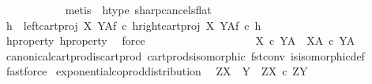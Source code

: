 \begin{isabellebody}
\ \ \ \ \ \ \ \ \ \ \isamarkupfalse%
\ {\isacharparenleft}{\kern0pt}metis\ \ h{\isacharunderscore}{\kern0pt}type\ sharp{\isacharunderscore}{\kern0pt}cancels{\isacharunderscore}{\kern0pt}flat{\isacharparenright}{\kern0pt}\isanewline
\ \ \ \ \ \ \ \ \isamarkupfalse%
\ \isamarkupfalse%
\ {\isachardoublequoteopen}h\ {\isacharequal}{\kern0pt}\ {\isasymlangle}{\isacharparenleft}{\kern0pt}left{\isacharunderscore}{\kern0pt}cart{\isacharunderscore}{\kern0pt}proj\ X\ Y\isactrlbsup A\isactrlesup \isactrlsub f\ {\isasymcirc}\isactrlsub c\ h{\isacharparenright}{\kern0pt}\isactrlsup {\isasymflat}{\isacharcomma}{\kern0pt}{\isacharparenleft}{\kern0pt}right{\isacharunderscore}{\kern0pt}cart{\isacharunderscore}{\kern0pt}proj\ X\ Y\isactrlbsup A\isactrlesup \isactrlsub f\ {\isasymcirc}\isactrlsub c\ h{\isacharparenright}{\kern0pt}\isactrlsup {\isasymflat}{\isasymrangle}\isactrlsup {\isasymsharp}{\isachardoublequoteclose}\isanewline
\ \ \ \ \ \ \ \ \ \ \isamarkupfalse%
\ h{\isacharunderscore}{\kern0pt}property{}\ h{\isacharunderscore}{\kern0pt}property{}\ \isamarkupfalse%
\ force\isanewline
\ \ \ \ \ \ \isamarkupfalse%
\isanewline
\ \ \ \ \isamarkupfalse%
\isanewline
\ \ \isamarkupfalse%
\isanewline
\ \ \isamarkupfalse%
\ \isamarkupfalse%
\ {\isachardoublequoteopen}{\isacharparenleft}{\kern0pt}X\ {\isasymtimes}\isactrlsub c\ Y{\isacharparenright}{\kern0pt}\isactrlbsup A\isactrlesup \ {\isasymcong}\ X\isactrlbsup A\isactrlesup \ {\isasymtimes}\isactrlsub c\ Y\isactrlbsup A\isactrlesup {\isachardoublequoteclose}\isanewline
\ \ \ \ \isamarkupfalse%
\ canonical{\isacharunderscore}{\kern0pt}cart{\isacharunderscore}{\kern0pt}prod{\isacharunderscore}{\kern0pt}is{\isacharunderscore}{\kern0pt}cart{\isacharunderscore}{\kern0pt}prod\ cart{\isacharunderscore}{\kern0pt}prods{\isacharunderscore}{\kern0pt}isomorphic\ fst{\isacharunderscore}{\kern0pt}conv\ is{\isacharunderscore}{\kern0pt}isomorphic{\isacharunderscore}{\kern0pt}def\ \isamarkupfalse%
\ fastforce\isanewline
{}\isamarkupfalse%
%
\endisatagproof
{\isafoldproof}%
%
\isadelimproof
\isanewline
%
\endisadelimproof
\isanewline
{}\isamarkupfalse%
\ exponential{\isacharunderscore}{\kern0pt}coprod{\isacharunderscore}{\kern0pt}distribution{\isacharcolon}{\kern0pt}\isanewline
\ \ {\isachardoublequoteopen}Z\isactrlbsup {\isacharparenleft}{\kern0pt}X\ {\isasymCoprod}\ Y{\isacharparenright}{\kern0pt}\isactrlesup \ {\isasymcong}\ {\isacharparenleft}{\kern0pt}Z\isactrlbsup X\isactrlesup {\isacharparenright}{\kern0pt}\ {\isasymtimes}\isactrlsub c\ {\isacharparenleft}{\kern0pt}Z\isactrlbsup Y\isactrlesup {\isacharparenright}{\kern0pt}{\isachardoublequoteclose}\isanewline

\end{isabellebody}

